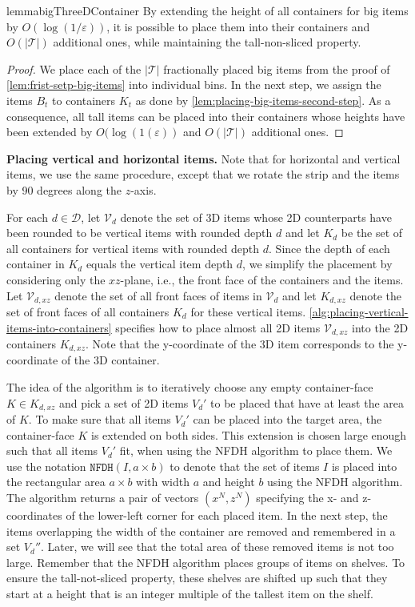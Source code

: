 \documentclass[a4paper,UKenglish,cleveref, autoref, thm-restate]{lipics-v2021}
\newcommand{\eps}{\varepsilon}
\newcommand{\bigy}{big\xspace}
\begin{document}
\begin{restatable}{lemma}{bigThreeDContainer}
\label{lem:packing-bins-into-containers}
By extending the height of all containers for \bigy items by $O(\log(1/\eps))$, it is possible to place them into their containers and $O(|\mathcal{T}|)$ additional ones, while maintaining the tall-non-sliced property.
\end{restatable}

\begin{proof}
We place each of the $|\mathcal{T}|$ fractionally placed \bigy items from the proof of \cref{lem:frist-setp-big-items} into individual bins.
In the next step, we assign the items $B_t$ to containers $K_t$ as done by \cref{lem:placing-big-items-second-step}.
As a consequence, all tall items can be placed into their containers whose heights have been extended by $O(\log(1(\eps))$ and $O(|\mathcal{T}|)$ additional ones.
\end{proof}


\noindent \textbf{Placing vertical and horizontal items.}
Note that for horizontal and vertical items, we use the same procedure, except that we rotate the strip and the items by 90 degrees along the $z$-axis. 

For each $d\in \mathcal{D}$, let $\mathcal{V}_d$ denote the set of 3D items whose 2D counterparts have been rounded to be vertical items with rounded depth $d$ and let $K_d$ be the set of all containers for vertical items with rounded depth $d$. 
Since the depth of each container in $K_d$ equals the vertical item depth $d$, we simplify the placement by considering only the $xz$-plane, i.e., the front face of the containers and the items.
Let $\mathcal{V}_{d,xz}$ denote the set of all front faces of items in $\mathcal{V}_d$ and let $K_{d,xz}$ denote the set of front faces of all containers $K_d$ for these vertical items.
\cref{alg:placing-vertical-items-into-containers} specifies how to place almost all 2D items $\mathcal{V}_{d,xz}$ into the 2D containers $K_{d,xz}$.
Note that the y-coordinate of the 3D item corresponds to the y-coordinate of the 3D container.

The idea of the algorithm is to iteratively choose any empty container-face $K \in K_{d,xz}$ and pick a set of 2D items $V_d'$ to be placed that have at least the area of $K$.
To make sure that all items $V_d'$ can be placed into the target area, the container-face $K$ is extended on both sides.
This extension is chosen large enough such that all items $V_d'$ fit, when using the NFDH algorithm to place them.
We use the notation $\texttt{NFDH}(I, a \times b)$ to denote that the set of items $I$ is placed into the rectangular area $a \times b$ with width $a$ and height $b$ using the NFDH algorithm.
The algorithm returns a pair of vectors $(x^N,z^N)$ specifying the x- and z-coordinates of the lower-left corner for each placed item.
In the next step, the items overlapping the width of the container are removed and remembered in a set $V_d''$. 
Later, we will see that the total area of these removed items is not too large.
Remember that the NFDH algorithm places groups of items on shelves.
To ensure the tall-not-sliced property, these shelves are shifted up such that they start at a height that is an integer multiple of the tallest item on the shelf.
\end{document}
